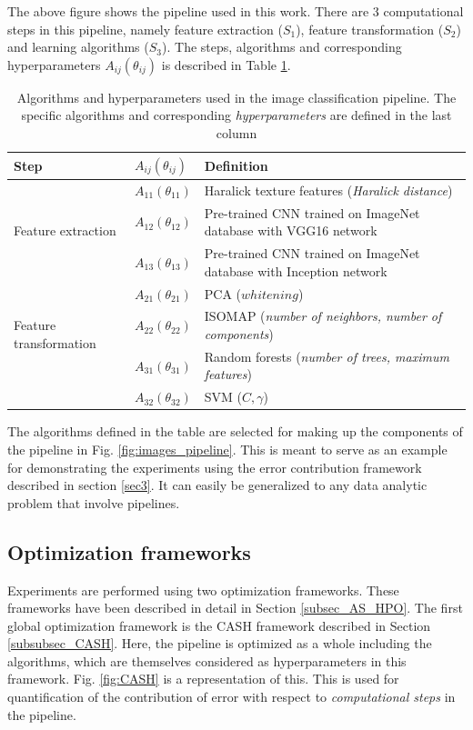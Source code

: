   The above figure shows the pipeline used in this work. There are 3 computational steps in this pipeline, namely feature extraction ($S_1$), feature transformation ($S_2$) and learning algorithms ($S_3$). The steps, algorithms and corresponding hyperparameters $A_{ij}(\theta_{ij})$ is described in Table \ref{table:algorithms_table}.

\begin{table}[ht!]
\centering
\caption{Algorithms and hyperparameters used in the image classification pipeline. The specific algorithms and corresponding \textit{hyperparameters} are defined in the last column}
\begin{tabular}{@{} |m{9.7em}|m{1.5cm}|m{8cm}| @{}} 
 \hline
 Step & $A_{ij}(\theta_{ij})$ & Definition \\ 
 \hline
 \multirow{3}{*}{Feature extraction} & $A_{11}(\theta_{11})$ & Haralick texture features (\textit{Haralick distance}) \\ 
 & $A_{12}(\theta_{12})$ & Pre-trained CNN trained on ImageNet \cite{deng2009imagenet} database with VGG16 \cite{simonyan2014very} network  \\
  & $A_{13}(\theta_{13})$ & Pre-trained CNN trained on ImageNet \cite{deng2009imagenet} database with Inception \cite{szegedy2016rethinking} network  \\
 \hline
 \multirow{3}{*}{Feature transformation} & $A_{21}(\theta_{21})$ & PCA ($whitening$) \cite{wold1987principal} \\
 & $A_{22}(\theta_{22})$ & ISOMAP (\textit{number of neighbors, number of components}) \cite{tenenbaum2000global} \\
 \hline
 \multirow{3}{*}{Learning algorithms} & $A_{31}(\theta_{31})$ & Random forests (\textit{number of trees, maximum features}) \cite{breiman2001random} \\
 & $A_{32}(\theta_{32})$ & SVM ($C, \gamma$) \cite{cortes1995support}\\
 \hline
 \end{tabular}
 \label{table:algorithms_table}
\end{table}
The algorithms defined in the table are selected for making up the components of the pipeline in Fig. \ref{fig:images_pipeline}. This is meant to serve as an example for demonstrating the experiments using the error contribution framework described in section \ref{sec3}. It can easily be generalized to any data analytic problem that involve pipelines. 

\subsection{Optimization frameworks}
\label{frameworks}
Experiments are performed using two optimization frameworks. These frameworks have been described in detail in Section \ref{subsec_AS_HPO}. 
The first global optimization framework is the CASH framework described in Section \ref{subsubsec_CASH}. Here, the pipeline is optimized as a whole including the algorithms, which are themselves considered as hyperparameters in this framework.  Fig. \ref{fig:CASH} is a representation of this. This is used for quantification of the contribution of error with respect to \textit{computational steps} in the pipeline.

